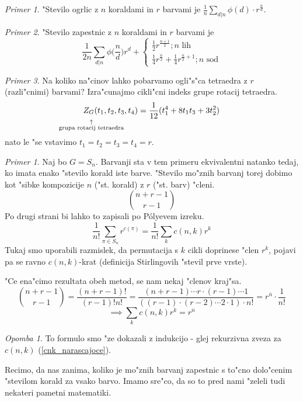 \documentclass[a4paper,12pt]{article}
\theoremstyle{definition}
\theoremstyle{remark}
\newtheorem*{ex}{Primer}
\newtheorem*{rem}{Opomba}
\newtheorem{ex*}[counter]{Primer}
\begin{document}
\begin{ex}
	"Stevilo ogrlic z $n$ koraldami in $r$ barvami je $\frac{1}{n}\sum_{d|n}\phi(d)\cdot r^{\frac{n}{d}}$.
\end{ex}
\begin{ex}
	"Stevilo zapestnic z $n$ koraldami in $r$ barvami je
	\[ \frac{1}{2n} \sum_{d | n} \phi\big(\frac{n}{d}\big) r^d + \begin{cases}\frac{1}{2} r^{\frac{n+1}{2}}; n\text{ lih}\\ \frac{1}{4} r^{\frac{n}{2}} + \frac{1}{4}r^{\frac{n}{2}+1}; n\text{ sod} \end{cases} \]
\end{ex}
\begin{ex}
	Na koliko na"cinov lahko pobarvamo ogli"s"ca tetraedra z $r$ (razli"cnimi) barvami? Izra"cunajmo cikli"cni indeks grupe rotacij tetraedra.
	\[ Z_{\substack{G \\ \\ \uparrow \\ \mathclap{\text{grupa rotacij tetraedra}}}} (t_1,t_2,t_3,t_4) = \frac{1}{12}(t_1^4 + 8t_1t_3 + 3t_2^2) \]
	nato le "se vstavimo $t_1 = t_2 = t_3 = t_4 = r$.
\end{ex}
\begin{ex*}\label{polyeva_dokaz_rekurzivne_cnk}
	Naj bo $G = S_n$. Barvanji sta v tem primeru ekvivalentni natanko tedaj, ko imata enako "stevilo korald iste barve. "Stevilo mo"znih barvanj torej dobimo kot "sibke kompozicije $n$ ("st. korald) z $r$ ("st. barv) "cleni.
	\[\binom{n+r-1}{r-1} \]
	Po drugi strani bi lahko to zapisali po P\'{o}lyevem izreku.
	\[ \frac{1}{n!}\sum_{\pi \in S_n} r^{c(\pi)} = \frac{1}{n!}\sum_k c(n,k) r^k \]
	Tukaj smo uporabili razmislek, da permutacija s $k$ cikli doprinese "clen $r^k$, pojavi pa se ravno $c(n, k)$-krat (definicija Stirlingovih "stevil prve vrste).
	
	"Ce ena"cimo rezultata obeh metod, se nam nekaj "clenov kraj"sa.
	\[ \binom{n+r-1}{r-1} = \frac{(n+r-1)!}{(r-1)!n!} = \frac{(n+r-1)\cdots r \cdot(r-1)\cdots1}{((r-1)\cdot(r-2)\cdots2\cdot1)\cdot n!} = r^{\overline{n}} \cdot \frac{1}{n!} \]
	\[ \implies \sum_k c(n,k) r^k = r^{\overline{n}} \]
	\begin{rem}
		To formulo smo "ze dokazali z indukcijo - glej rekurzivna zveza za $c(n, k)$ (\ref{cnk_narascajoce}).
	\end{rem}
\end{ex*}



Recimo, da nas zanima, koliko je mo"znih barvanj zapestnic s to"cno dolo"cenim "stevilom korald za vsako barvo. Imamo sre"co, da so to pred nami "zeleli tudi nekateri pametni matematiki.
\end{document}
